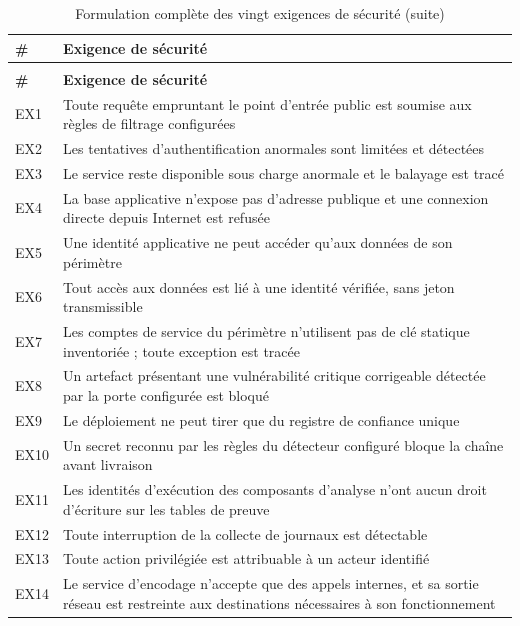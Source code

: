 {\footnotesize
\setlength{\tabcolsep}{3pt}
\begin{longtable}{|P{1cm}|P{14.5cm}|}
\caption{Formulation complète des vingt exigences de sécurité}
\label{tab:exigences} \\
\hline
\textbf{\#} & \textbf{Exigence de sécurité} \\
\hline
\endfirsthead
\caption[]{Formulation complète des vingt exigences de sécurité (suite)} \\
\hline
\textbf{\#} & \textbf{Exigence de sécurité} \\
\hline
\endhead
EX1 & Toute requête empruntant le point d'entrée public est soumise aux règles de filtrage configurées \\ \hline
EX2 & Les tentatives d'authentification anormales sont limitées et détectées \\ \hline
EX3 & Le service reste disponible sous charge anormale et le balayage est tracé \\ \hline
EX4 & La base applicative n'expose pas d'adresse publique et une connexion directe depuis Internet est refusée \\ \hline
EX5 & Une identité applicative ne peut accéder qu'aux données de son périmètre \\ \hline
EX6 & Tout accès aux données est lié à une identité vérifiée, sans jeton transmissible \\ \hline
EX7 & Les comptes de service du périmètre n'utilisent pas de clé statique inventoriée ; toute exception est tracée \\ \hline
EX8 & Un artefact présentant une vulnérabilité critique corrigeable détectée par la porte configurée est bloqué \\ \hline
EX9 & Le déploiement ne peut tirer que du registre de confiance unique \\ \hline
EX10 & Un secret reconnu par les règles du détecteur configuré bloque la chaîne avant livraison \\ \hline
EX11 & Les identités d'exécution des composants d'analyse n'ont aucun droit d'écriture sur les tables de preuve \\ \hline
EX12 & Toute interruption de la collecte de journaux est détectable \\ \hline
EX13 & Toute action privilégiée est attribuable à un acteur identifié \\ \hline
EX14 & Le service d'encodage n'accepte que des appels internes, et sa sortie réseau est restreinte aux destinations nécessaires à son fonctionnement \\ \hline

\end{longtable}}

